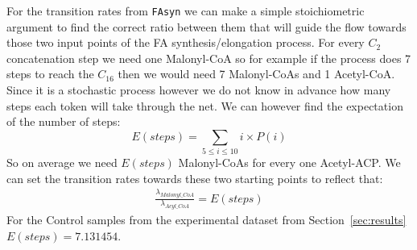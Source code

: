 For the transition rates from \texttt{FAsyn} we can make a simple
stoichiometric argument to find the correct ratio between them that
will guide the flow towards those two input points of the FA
synthesis/elongation process. For every $C_2$ concatenation step we
need one Malonyl-CoA so for example if the process does 7 steps to
reach the $C_{16}$ then we would need 7 Malonyl-CoAs and 1
Acetyl-CoA. Since it is a stochastic process however we do not know in
advance how many steps each token will take through the net. We can
however find the expectation of the number of steps:
\begin{equation*}
E(steps)=\sum_{5 \leq i \leq 10} i \times P(i)
\end{equation*}
So on average we need $E(steps)$ Malonyl-CoAs for every one
Acetyl-ACP. We can set the transition rates towards these two starting
points to reflect that:
\begin{align*}
\frac{\lambda_{Malonyl\_CoA}}{\lambda_{Acyl\_CoA}} = E(steps)
\end{align*}
For the Control samples from the experimental dataset from
Section~\ref{sec:results} $E(steps)=7.131454$.
